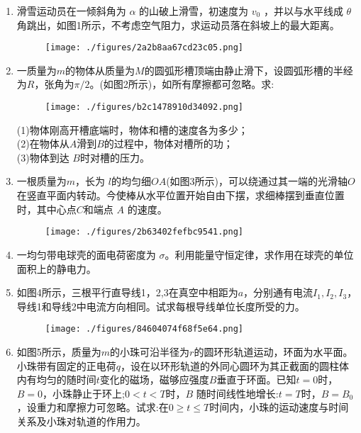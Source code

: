 \begin{enumerate}
\item 滑雪运动员在一倾斜角为 $\alpha$ 的山破上滑雪，初速度为 $v_0$ ，并以与水平线成 $\theta$ 角跳出，如图1所示，不考虑空气阻力，求运动员落在斜坡上的最大距离。
\begin{figure}[ht]
\centering
\texttt{[image: ./figures/2a2b8aa67cd23c05.png]}
\caption{} \label{fig_ZKYP03_1}
\end{figure}
\item 一质量为$m$的物体从质量为$M$的圆弧形槽顶端由静止滑下，设圆弧形槽的半经为$R$，张角为$\pi /2$。(如图2所示)，如所有摩擦都可忽略。求:\\
\begin{figure}[ht]
\centering
\texttt{[image: ./figures/b2c1478910d34092.png]}
\caption{} \label{fig_ZKYP03_2}
\end{figure}
(1)物体刚高开槽底端时，物体和槽的速度各为多少；\\
(2)在物体从$A$滑到$B$的过程中，物体对槽所的功；\\
(3)物体到达 $B $时对槽的压力。
\item 一根质量为$m$，长为  $l$的均匀细$OA$(如图3所示)，可以绕通过其一端的光滑轴$O$在竖直平面内转动。今使棒从水平位置开始自由下摆，求细棒摆到垂直位置时，其中心点$C$和端点 $A$ 的速度。
\begin{figure}[ht]
\centering
\texttt{[image: ./figures/2b63402fefbc9541.png]}
\caption{} \label{fig_ZKYP03_3}
\end{figure}
\item 一均匀带电球壳的面电荷密度为 $\sigma$。利用能量守恒定律，求作用在球壳的单位面积上的静电力。
\item 如图4所示，三根平行直导线1，2,3在真空中相距为$a$，分别通有电流$I_1,I_2,I_3$，导线1和导线2中电流方向相同。试求每根导线单位长度所受的力。
\begin{figure}[ht]
\centering
\texttt{[image: ./figures/84604074f68f5e64.png]}
\caption{} \label{fig_ZKYP03_4}
\end{figure}
\item 如图5所示，质量为$m$的小珠可沿半径为$r$的圆环形轨道运动，环面为水平面。小珠带有固定的正电荷$q$，设在以环形轨道的外同心圆环为其正截面的圆柱体内有均匀的随时间$t$变化的磁场，磁够应强度$B$垂直于环面。已知$t=0$时，$B=0$，小珠静止于环上;$0<t<T$时，$B$ 随时间线性地增长:$t=T$时，$B=B_0$，设重力和摩擦力可忽略。试求:在$0\ge t \le T$时间内，小珠的运动速度与时间关系及小珠对轨道的作用力。

\end{enumerate}
